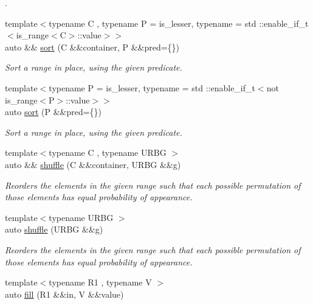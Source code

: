\begin{DoxyCompactItemize}
\begin{DoxyCompactList}
. \end{DoxyCompactList}\item 
{\footnotesize template$<$typename C , typename P  = is\+\_\+lesser, typename  = std \+::enable\+\_\+if\+\_\+t$<$is\+\_\+range$<$\+C$>$\+::value$>$$>$ }\\auto \&\& \mbox{\hyperlink{namespacerah_1_1action_ae8518431f6e5e7415a6739c65e874ab8}{sort}} (C \&\&container, P \&\&pred=\{\})
\begin{DoxyCompactList}\small\item\em Sort a range in place, using the given predicate. \end{DoxyCompactList}\item 
{\footnotesize template$<$typename P  = is\+\_\+lesser, typename  = std \+::enable\+\_\+if\+\_\+t$<$not is\+\_\+range$<$\+P$>$\+::value$>$$>$ }\\auto \mbox{\hyperlink{namespacerah_1_1action_ac1603fdf8fc87e84c277c216a5176674}{sort}} (P \&\&pred=\{\})
\begin{DoxyCompactList}\small\item\em Sort a range in place, using the given predicate. \end{DoxyCompactList}\item 
{\footnotesize template$<$typename C , typename U\+R\+BG $>$ }\\auto \&\& \mbox{\hyperlink{namespacerah_1_1action_ab9352bcbc01fd4fa9eeba64766fa32b3}{shuffle}} (C \&\&container, U\+R\+BG \&\&g)
\begin{DoxyCompactList}\small\item\em Reorders the elements in the given range such that each possible permutation of those elements has equal probability of appearance. \end{DoxyCompactList}\item 
{\footnotesize template$<$typename U\+R\+BG $>$ }\\auto \mbox{\hyperlink{namespacerah_1_1action_add6b8e704a8e603302290792a45a5c06}{shuffle}} (U\+R\+BG \&\&g)
\begin{DoxyCompactList}\small\item\em Reorders the elements in the given range such that each possible permutation of those elements has equal probability of appearance. \end{DoxyCompactList}\item 
{\footnotesize template$<$typename R1 , typename V $>$ }\\auto \mbox{\hyperlink{namespacerah_1_1action_afee3c0ce8604f13a4e8a6f1975d335f6}{fill}} (R1 \&\&in, V \&\&value)

\end{DoxyCompactItemize}
